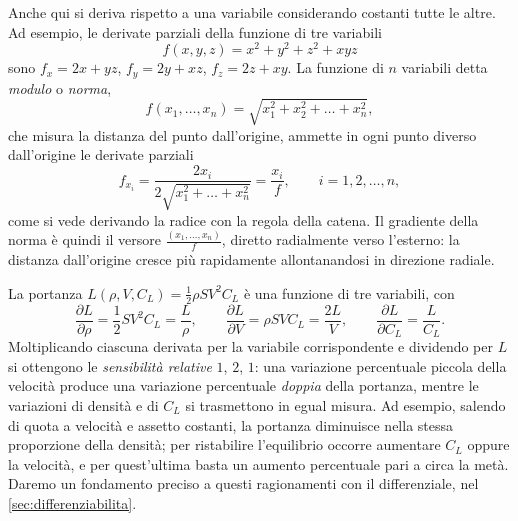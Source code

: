 Anche qui si deriva rispetto a una variabile considerando costanti tutte le altre. Ad
esempio, le derivate parziali della funzione di tre variabili
\begin{equation}\label{eq:f-tre-variabili}
  f(x,y,z)=x^{2}+y^{2}+z^{2}+xyz
\end{equation}
sono $f_{x}=2x+yz$, $f_{y}=2y+xz$, $f_{z}=2z+xy$. La funzione di $n$ variabili detta
\emph{modulo} o \emph{norma},
\begin{equation}\label{eq:norma}
  f(x_{1},\dots,x_{n})=\sqrt{x_{1}^{2}+x_{2}^{2}+\dots+x_{n}^{2}},
\end{equation}
che misura la distanza del punto dall'origine, ammette in ogni punto diverso
dall'origine le derivate parziali
\begin{equation}\label{eq:norma-derivate}
  f_{x_{i}}=\frac{2x_{i}}{2\sqrt{x_{1}^{2}+\dots+x_{n}^{2}}}=\frac{x_{i}}{f},
  \qquad i=1,2,\dots,n,
\end{equation}
come si vede derivando la radice con la regola della catena. Il gradiente della norma è
quindi il versore $\frac{(x_{1},\dots,x_{n})}{f}$, diretto radialmente verso l'esterno:
la distanza dall'origine cresce più rapidamente allontanandosi in direzione radiale.

\begin{esempio}\label{es:portanza-tre}
La portanza $L(\rho,V,C_{L})=\frac12\rho SV^{2}C_{L}$ è una funzione di tre variabili, con
\[
  \frac{\partial L}{\partial\rho}=\frac12SV^{2}C_{L}=\frac L\rho, \qquad
  \frac{\partial L}{\partial V}=\rho SVC_{L}=\frac{2L}V, \qquad
  \frac{\partial L}{\partial C_{L}}=\frac{L}{C_{L}} .
\]
Moltiplicando ciascuna derivata per la variabile corrispondente e dividendo per $L$ si
ottengono le \emph{sensibilità relative} $1$, $2$, $1$: una variazione percentuale piccola
della velocità produce una variazione percentuale \emph{doppia} della portanza, mentre
le variazioni di densità e di $C_{L}$ si trasmettono in egual misura. Ad esempio, salendo
di quota a velocità e assetto costanti, la portanza diminuisce nella stessa proporzione
della densità; per ristabilire l'equilibrio occorre aumentare $C_{L}$ oppure la velocità,
e per quest'ultima basta un aumento percentuale pari a circa la metà. Daremo un
fondamento preciso a questi ragionamenti con il differenziale, nel
\cref{sec:differenziabilita}.
\end{esempio}


